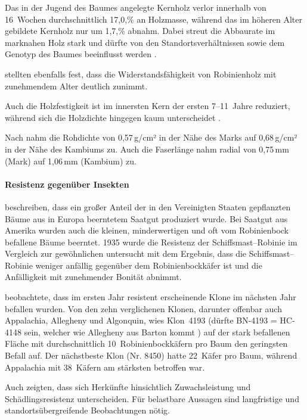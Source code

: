 \documentclass[twocolumn]{scrartcl}
\begin{document}
Das in der Jugend
des Baumes angelegte Kernholz verlor innerhalb von 16~Wochen
durchschnittlich 17,0,\% an Holzmasse, während das im höheren Alter
gebildete Kernholz nur um 1,7,\% abnahm. Dabei streut die Abbaurate im
marknahen Holz stark und dürfte von den Standortsverhältnissen sowie
dem Genotyp des Baumes beeinflusst werden \citep{brischke2024robineDauerhaftigkeit}.

\citet{szczepkowski2025robinePilze} stellten ebenfalls fest, dass die
Widerstandsfähigkeit von Robinienholz mit zunehmendem Alter deutlich
zunimmt.

Auch die Holzfestigkeit ist im innersten Kern der ersten 7--11~Jahre
reduziert, während sich die Holzdichte hingegen kaum unterscheidet
\citep{adamopoulos2007jungesUndAltesRobinienholz,bijak2021robinienholz}.

Nach \citet{stringer1987robinieHolzdichte} nahm die Rohdichte von
0,57\,g/cm² in der Nähe des Marks auf 0,68\,g/cm² in der Nähe des
Kambiums zu. Auch die Faserlänge nahm radial von 0,75\,mm (Mark)
auf 1,06\,mm (Kambium) zu.

\paragraph{Resistenz gegenüber Insekten}

\citet{hall1937robinie,cummings1947robinie} beschreiben, dass ein
großer Anteil der in den Vereinigten Staaten gepflanzten Bäume aus in
Europa beerntetem Saatgut produziert wurde. Bei Saatgut aus Amerika
wurden auch die kleinen, minderwertigen und oft vom Robinienbock
befallene Bäume beerntet. 1935 wurde die Resistenz der
Schiffsmast--Robinie im Vergleich zur gewöhnlichen untersucht mit dem
Ergebnis, dass die Schiffsmast--Robinie weniger anfällig gegenüber dem
Robinienbockkäfer ist und die Anfälligkeit mit zunehmender Bonität
abnimmt.

\citet{wollerman1968robinieBorer} beobachtete, dass im ersten Jahr
resistent erscheinende Klone im nächsten Jahr befallen wurden.  Von
den zehn verglichenen Klonen, darunter offenbar auch Appalachia,
Allegheny und Algonquin, wies Klon~4193 (dürfte BN-4193 = HC-4148
sein, welcher wie Allegheny aus Barton kommt
\citep{santamour1960robinie,steinergroup1987robinie}) auf der stark
befallenen Fläche mit durchschnittlich 10~Robinienbockkäfern pro Baum
den geringsten Befall auf. Der nächstbeste Klon (Nr. 8450) hatte
22~Käfer pro Baum, während Appalachia mit 38~Käfern am stärksten
betroffen war.

Auch \citet{genys1990robinie,bridgen1988robinie,mebrahtu1989robinie}
zeigten, dass sich Herkünfte hinsichtlich Zuwachsleistung und
Schädlingsresistenz unterscheiden.  Für belastbare Aussagen sind
langfristige und standortsübergreifende Beobachtungen nötig.
\end{document}
